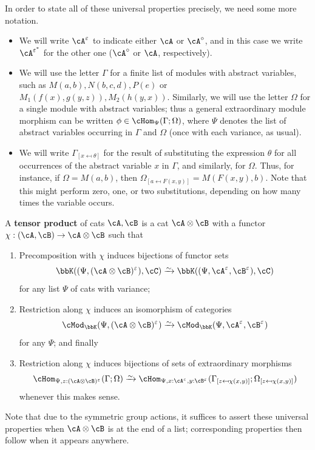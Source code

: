 \documentclass{amsart}
\newcommand{\A}{\cA}
\newcommand{\B}{\cB}
\newcommand{\C}{\cC}
\newcommand{\K}{\bbK}
\let\mod\cMod
\def\modk{\mod_\K}
\renewcommand{\o}{^{\circ}}
\newcommand{\e}[1][]{^{\varepsilon_{#1}}}
\newcommand{\epbar}{^{\varepsilon^*}}
\def\mhomv#1#2#3{\cHom_{#1}(#2;#3)}
\newcommand{\subst}[3]{{#1}_{[#2 \mapsfrom #3]}}
\begin{document}
In order to state all of these universal properties precisely, we need some more notation.
\begin{itemize}
\item We will write $\A\e$ to indicate either $\A$ or $\A\o$, and in this case we write $\A\epbar$ for the other one ($\A\o$ or $\A$, respectively).
\item We will use the letter $\Gamma$ for a finite list of modules with abstract variables, such as $M(a,b),N(b,c,d),P(e)$ or $M_1(f(x),g(y,z)),M_2(h(y,x))$.
  Similarly, we will use the letter $\Omega$ for a single module with abstract variables; thus a general extraordinary module morphism can be written $\phi\in\mhomv{\Psi}{\Gamma}{\Omega}$, where $\Psi$ denotes the list of abstract variables occurring in $\Gamma$ and $\Omega$ (once with each variance, as usual).
\item We will write $\subst\Gamma x \theta$ for the result of substituting the expression $\theta$ for all occurrences of the abstract variable $x$ in $\Gamma$, and similarly, for $\Omega$.
  Thus, for instance, if $\Omega = M(a,b)$, then $\subst\Omega a{F(x,y)} = M(F(x,y),b)$.
  Note that this might perform zero, one, or two substitutions, depending on how many times the variable occurs.
\end{itemize}

\begin{defn}\label{defn:tens-cat}
  A \textbf{tensor product} of cats $\A,\B$ is a cat $\A\otimes \B$ with a functor $\chi:(\A,\B) \to \A\otimes \B$ such that
  \begin{enumerate}
  \item Precomposition with $\chi$ induces bijections of functor sets
    \[ \K((\Psi,(\A\otimes \B)\e),\C) \toiso \K((\Psi,\A\e,\B\e),\C)\]
    for any list $\Psi$ of cats with variance;\label{item:tenscat-1}
  \item Restriction along $\chi$ induces an isomorphism of categories
    \[ \modk(\Psi,(\A\otimes \B)\e) \toiso \modk(\Psi,\A\e,\B\e) \]
    for any $\Psi$; and finally
  \item Restriction along $\chi$ induces bijections of sets of extraordinary morphisms
    \[ \mhomv{\Psi,z:(\A\otimes \B)\e}{\Gamma}{\Omega}\toiso \mhomv{\Psi,x:\A\e,y:\B\e}{\subst\Gamma z{\chi(x,y)}}{\subst \Omega z {\chi(x,y)}}\]
    whenever this makes sense.\label{item:tenscat-3}
  \end{enumerate}
\end{defn}

Note that due to the symmetric group actions, it suffices to assert these universal properties when $\A\otimes \B$ is at the end of a list; corresponding properties then follow when it appears anywhere.
\end{document}
